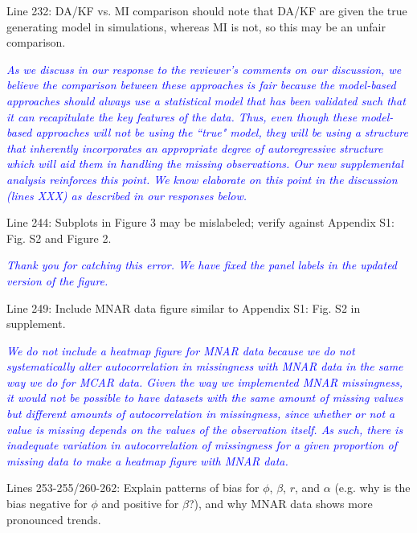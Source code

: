 \documentclass{article}
\begin{document}
\begin{linenumbers}
Line 232: DA/KF vs. MI comparison should note that DA/KF are given the true generating model in simulations, whereas MI is not, so this may be an unfair comparison.

\noindent \textcolor{blue}{\textit{As we discuss in our response to the reviewer's comments on our discussion, we believe the comparison between these approaches is fair because the model-based approaches should always use a statistical model that has been validated such that it can recapitulate the key features of the data. Thus, even though these model-based approaches will not be using the ``true" model, they will be using a structure that inherently incorporates an appropriate degree of autoregressive structure which will aid them in handling the missing observations. Our new supplemental analysis reinforces this point. We know elaborate on this point in the discussion (lines XXX) as described in our responses below.}}

Line 244: Subplots in Figure 3 may be mislabeled; verify against Appendix S1: Fig. S2 and Figure 2.

\noindent \textcolor{blue}{\textit{Thank you for catching this error. We have fixed the panel labels in the updated version of the figure.}}

Line 249: Include MNAR data figure similar to Appendix S1: Fig. S2 in supplement.

\noindent \textcolor{blue}{\textit{We do not include a heatmap figure for MNAR data because we do not systematically alter autocorrelation in missingness with MNAR data in the same way we do for MCAR data. Given the way we implemented MNAR missingness, it would not be possible to have datasets with the same amount of missing values but different amounts of autocorrelation in missingness, since whether or not a value is missing depends on the values of the observation itself. As such, there is inadequate variation in autocorrelation of missingness for a given proportion of missing data to make a heatmap figure with MNAR data.}} 


Lines 253-255/260-262: Explain patterns of bias for $\phi$, $\beta$, $r$, and $\alpha$ (e.g. why is the bias negative for $\phi$ and positive for $\beta$?), and why MNAR data shows more pronounced trends.


\end{linenumbers}
\end{document}
